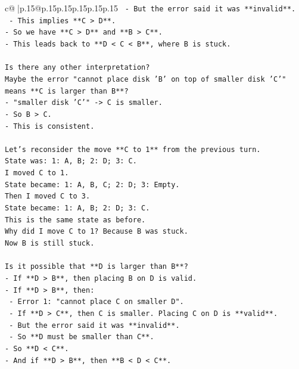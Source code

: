 \documentclass{article}
\begin{document}
{\begin{supertabular}{c@{$\;$}|p{.15\linewidth}@{}p{.15\linewidth}p{.15\linewidth}p{.15\linewidth}p{.15\linewidth}p{.15\linewidth}}
{{{\texttt{    {-} But the error said it was **invalid**.} \\
\texttt{    {-} This implies **C > D**.} \\
\texttt{{-} So we have **C > D** and **B > C**.} \\
\texttt{{-} This leads back to **D < C < B**, where B is stuck.} \\
\\ 
\texttt{Is there any other interpretation?} \\
\texttt{Maybe the error "cannot place disk 'B' on top of smaller disk 'C'" means **C is larger than B**?} \\
\texttt{{-} "smaller disk 'C'" {-}> C is smaller.} \\
\texttt{{-} So B > C.} \\
\texttt{{-} This is consistent.} \\
\\ 
\texttt{Let's reconsider the move **C to 1** from the previous turn.} \\
\texttt{State was: 1: A, B; 2: D; 3: C.} \\
\texttt{I moved C to 1.} \\
\texttt{State became: 1: A, B, C; 2: D; 3: Empty.} \\
\texttt{Then I moved C to 3.} \\
\texttt{State became: 1: A, B; 2: D; 3: C.} \\
\texttt{This is the same state as before.} \\
\texttt{Why did I move C to 1? Because B was stuck.} \\
\texttt{Now B is still stuck.} \\
\\ 
\texttt{Is it possible that **D is larger than B**?} \\
\texttt{{-} If **D > B**, then placing B on D is valid.} \\
\texttt{{-} If **D > B**, then:} \\
\texttt{    {-} Error 1: "cannot place C on smaller D".} \\
\texttt{        {-} If **D > C**, then C is smaller. Placing C on D is **valid**.} \\
\texttt{        {-} But the error said it was **invalid**.} \\
\texttt{        {-} So **D must be smaller than C**.} \\
\texttt{{-} So **D < C**.} \\
\texttt{{-} And if **D > B**, then **B < D < C**.} \\
}}}
\end{supertabular}}
\end{document}
